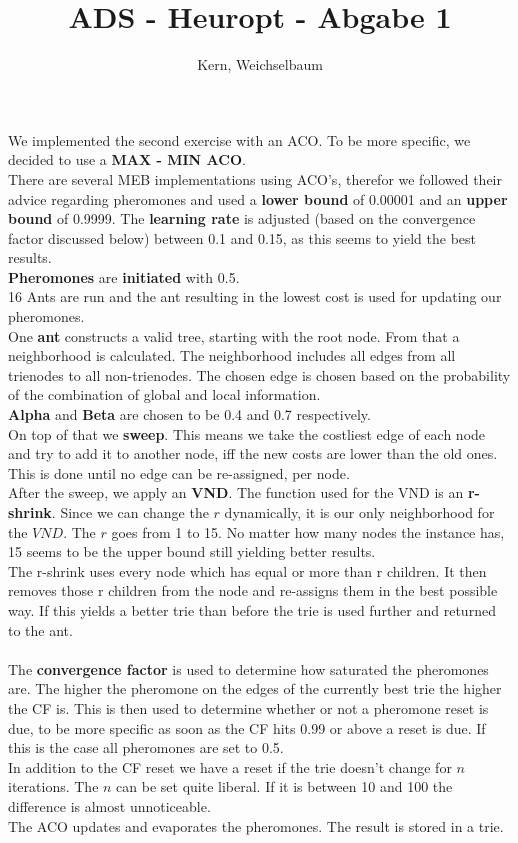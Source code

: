 \documentclass[12pt]{article}
\title{ADS - Heuropt - Abgabe 1}
\author{Kern, Weichselbaum}
\begin{document}
	
\maketitle

We implemented the second exercise with an ACO. To be more specific, we decided to use a \textbf{MAX - MIN ACO}.\\
There are several MEB implementations using ACO's, therefor we followed their advice regarding pheromones and used a \textbf{lower bound} of 0.00001 and an \textbf{upper bound} of 0.9999. The \textbf{learning rate} is adjusted (based on the convergence factor discussed below) between 0.1 and 0.15, as this seems to yield the best results.\\
\textbf{Pheromones} are \textbf{initiated} with 0.5.
\\
16 Ants are run and the ant resulting in the lowest cost is used for updating our pheromones. \\
One \textbf{ant} constructs a valid tree, starting with the root node. From that a neighborhood is calculated. The neighborhood includes all edges from all trienodes to all non-trienodes. The chosen edge is chosen based on the probability of the combination of global and local information.\\
\textbf{Alpha} and \textbf{Beta} are chosen to be 0.4 and 0.7 respectively.\\
On top of that we \textbf{sweep}. This means we take the costliest edge of each node and try to add it to another node, iff the new costs are lower than the old ones. This is done until no edge can be re-assigned, per node.\\
After the sweep, we apply an \textbf{VND}. The function used for the VND is an \textbf{r-shrink}. Since we can change the $r$ dynamically, it is our only neighborhood for the $VND$. The $r$ goes from 1 to 15. No matter how many nodes the instance has, 15 seems to be the upper bound still yielding better results.\\
The r-shrink uses every node which has equal or more than r children. It then removes those r children from the node and re-assigns them in the best possible way. If this yields a better trie than before the trie is used further and returned to the ant.\\
\\
The \textbf{convergence factor} is used to determine how saturated the pheromones are. The higher the pheromone on the edges of the currently best trie the higher the CF is. This is then used to determine whether or not a pheromone reset is due, to be more specific as soon as the CF hits 0.99 or above a reset is due. If this is the case all pheromones are set to 0.5.\\
In addition to the CF reset we have a reset if the trie doesn't change for $n$ iterations. The $n$ can be set quite liberal. If it is between 10 and 100 the difference is almost unnoticeable.
\\
The ACO updates and evaporates the pheromones. The result is stored in a trie.
\\
\\
\end{document}
